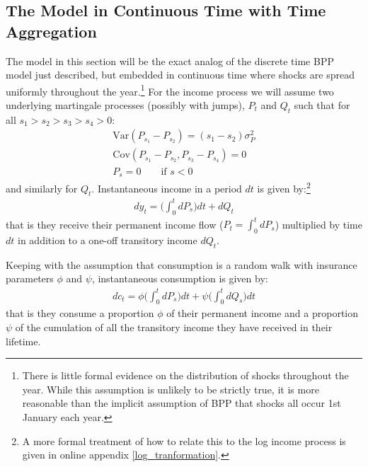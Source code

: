 \documentclass[AER]{AEA}
\begin{document}
\subsection{The Model in Continuous Time with Time Aggregation}
The model in this section will be the exact analog of the discrete time BPP model just described, but embedded in continuous time where shocks are spread uniformly throughout the year.\footnote{There is little formal evidence on the distribution of shocks throughout the year. While this assumption is unlikely to be strictly true, it is more reasonable than the implicit assumption of BPP that shocks all occur 1st January each year.} For the income process we will assume two underlying martingale processes (possibly with jumps), $P_t$ and $Q_t$ such that for all $s_1>s_2>s_3>s_4>0$:
\begin{align*}
\mathrm{Var}(P_{s_1}-P_{s_2})=(s_1-s_2)\sigma_P^2 \\
\mathrm{Cov}(P_{s_1}-P_{s_2},P_{s_3}-P_{s_4}) = 0 \\
P_s = 0 \qquad \text{if } s<0
\end{align*}
and similarly for $Q_t$.  Instantaneous income in a period $dt$ is given by:\footnote{A more formal treatment of how to relate this to the log income process is given in online appendix \ref{log_tranformation}.}
\begin{align}
dy_t = \Big( \int_{0}^{t}dP_s \Big) dt  +dQ_t \label{income_process}
\end{align}
that is they receive their permanent income flow ($P_t =\int_{0}^{t}dP_s $) multiplied by time $dt$ in addition to a one-off transitory income $dQ_t$.

Keeping with the assumption that consumption is a random walk with insurance parameters $\phi$ and $\psi$, instantaneous consumption is given by:
\begin{align}
dc_t = \phi \Big( \int_{0}^{t} dP_s  \Big) dt +\psi\Big( \int_{0}^{t}dQ_s\Big) dt  \label{consumption_process}
\end{align}
that is they consume a proportion $\phi$ of their permanent income and a proportion $\psi$ of the cumulation of all the transitory income they have received in their lifetime.
\end{document}
